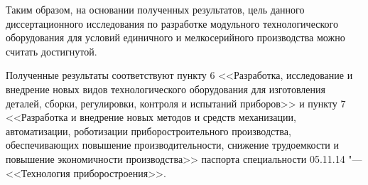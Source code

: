 Таким образом, на основании полученных результатов, цель данного диссертационного исследования по разработке модульного технологического оборудования для условий единичного и мелкосерийного производства можно считать достигнутой.

Полученные результаты соответствуют пункту 6 <<Разработка, исследование и внедрение новых видов технологического оборудования для изготовления деталей, сборки, регулировки, контроля и испытаний приборов>> и пункту 7 <<Разработка и внедрение новых методов и средств механизации, автоматизации, роботизации приборостроительного производства, обеспечивающих повышение производительности, снижение трудоемкости и повышение экономичности производства>> паспорта специальности 05.11.14 "--- <<Технология приборостроения>>.
